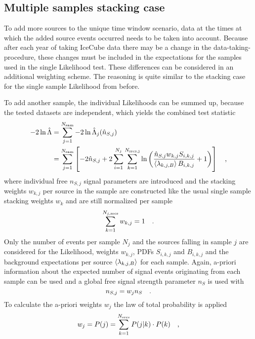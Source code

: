 \subsection{Multiple samples stacking case}
To add more sources to the unique time window scenario, data at the times at which the added source events occurred needs to be taken into account.
Because after each year of taking IceCube data there may be a change in the data-taking-procedure, these changes must be included in the expectations for the samples used in the single Likelihood test.
These differences can be considered in an additional weighting scheme.
The reasoning is quite similar to the stacking case for the single sample Likelihood from before.

To add another sample, the individual Likelihoods can be summed up, because the tested datasets are independent, which yields the combined test statistic
\begin{align}
  -2\ln\hat{\Lambda}
  &= \sum_{j=1}^{N_\text{sam}} -2\ln\hat{\Lambda}_j(\hat{n}_{S,j}) \\
  &= \sum_{j=1}^{N_\text{sam}} \left[
        -2\hat{n}_{S,j} +
        2\sum_{i=1}^{N_j} \sum_{k=1}^{N_\text{srcs,j}} \ln\left(
          \frac{\hat{n}_{S,j} w_{k,j} S_{i,k,j}}
               {\Braket{\lambda_{k,j,B}} B_{i,k,j}}
          + 1
        \right)
      \right]
  \quad\text{,}
\end{align}
where individual free $n_{S,j}$ signal parameters are introduced and the stacking weights $w_{k,j}$ per source in the sample are constructed like the usual single sample stacking weights $w_k$ and are still normalized per sample
\begin{equation}
  \sum_{k=1}^{N_{j,\text{srcs}}} w_{k,j} = 1
  \quad\text{.}
\end{equation}
Only the number of events per sample $N_j$ and the sources falling in sample $j$ are considered for the Likelihood, weights $w_{k,j}$, PDFs $S_{i,k,j}$ and $B_{i,k,j}$ and the background expectations per source $\Braket{\lambda_{k,j,B}}$ for each sample.
Again, a-priori information about the expected number of signal events originating from each sample can be used and a global free signal strength parameter $n_S$ is used with
\begin{equation}
  n_{S,j} = w_j n_S
  \quad\text{.}
\end{equation}
To calculate the a-priori weights $w_j$ the law of total probability is applied 
\begin{equation}
  w_j = P(j) = \sum_{k=1}^{N_\text{srcs}} P(j|k)\cdot P(k)
  \quad\text{,}
\end{equation}
